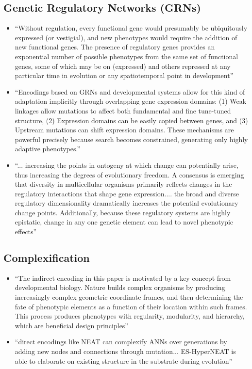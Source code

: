\subsection{Genetic Regulatory Networks (GRNs)}
  \begin{itemize}
    \item ``Without regulation, every functional gene would presumably be ubiquitously expressed (or vestigial), and new phenotypes would require the addition of new functional genes. The presence of regulatory genes provides an exponential number of possible phenotypes from the same set of functional genes, some of which may be on (expressed) and others repressed at any particular time in evolution or any spatiotemporal point in development'' \cite[p 220]{Downing2015IntelligenceSystems}
    \item ``Encodings based on GRNs and developmental systems allow for this kind of adaptation implicitly through overlapping gene expression domains: (1) Weak linkages allow mutations to affect both fundamental and fine tune-tuned structure, (2) Expression domains can be easily copied between genes, and (3) Upstream mutations can shift expression domains. These mechanisms are powerful precisely because search becomes constrained, generating only highly adaptive phenotypes.'' \cite{Reisinger2007AcquiringRepresentations}
    \item ``... increasing the points in ontogeny at which change can potentially arise, thus increasing the degrees of evolutionary freedom. A consensus is emerging that diversity in multicellular organisms primarily reflects changes in the regulatory interactions that shape gene expression.... the broad and diverse regulatory dimensionality dramatically increases the potential evolutionary change points. Additionally, because these regulatory systems are highly epistatic, change in any one genetic element can lead to novel phenotypic effects'' \cite{Moczek2011TheInnovation}
    \end{itemize}

\subsection{Complexification}
  \begin{itemize}
    \item ``The indirect encoding in this paper is motivated by a key concept from developmental biology. Nature builds complex organisms by producing increasingly complex geometric coordinate frames, and then determining the fate of phenotypic elements as a function of their location within such frames. This process produces phenotypes with regularity, modularity, and hierarchy, which are beneficial design principles'' \cite{Clune2011OnRegularity}
    \item ``direct encodings like NEAT can complexify ANNs over generations by adding new nodes and connections through mutation... ES-HyperNEAT is able to elaborate on existing structure in the substrate during evolution'' \cite{}
  \end{itemize}

